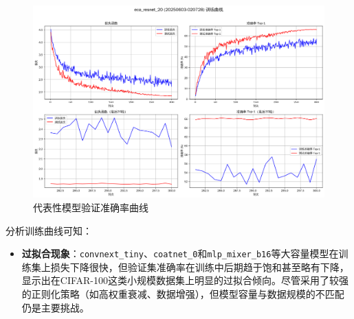\documentclass[a4paper]{article}
\begin{document}
\begin{figure}[H]
    \centering
    \includegraphics[width=\textwidth]{fig/training_curves_eca_resnet_20.png}
    \caption{代表性模型验证准确率曲线}
    \label{fig:acc_curves}
\end{figure}

分析训练曲线可知：
\begin{itemize}
    \item \textbf{过拟合现象}：\texttt{convnext\_tiny}、\texttt{coatnet\_0}和\texttt{mlp\_mixer\_b16}等大容量模型在训练集上损失下降很快，但验证集准确率在训练中后期趋于饱和甚至略有下降，显示出在CIFAR-100这类小规模数据集上明显的过拟合倾向。尽管采用了较强的正则化策略（如高权重衰减、数据增强），但模型容量与数据规模的不匹配仍是主要挑战。
\end{itemize}
\end{document}

